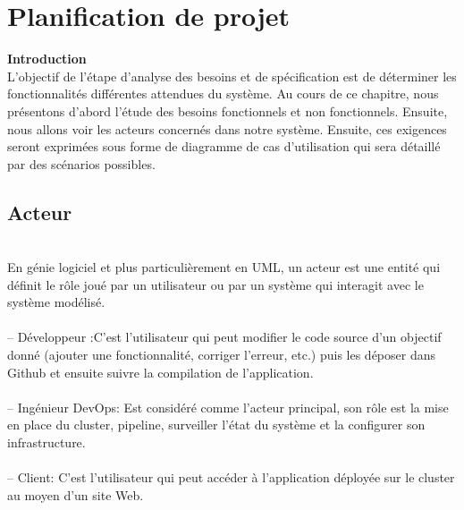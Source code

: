 
\chapter{ Planification de projet}
\newpage
\textbf{\huge Introduction}\\[0.5cm] 

\textsf{\selectfont{}
L'objectif de l'étape d'analyse des besoins et de spécification est de déterminer les fonctionnalités différentes attendues du système. Au cours de ce chapitre, nous présentons d'abord l'étude des besoins fonctionnels et non fonctionnels. Ensuite, nous allons voir les acteurs concernés dans notre système. Ensuite, ces exigences seront exprimées sous forme de diagramme de cas d'utilisation qui sera détaillé par des scénarios possibles.
}
\section{\LARGE Acteur}
\texttt{}\\[0.1cm]
\textsf{\selectfont{} En génie logiciel et plus particulièrement en UML, un acteur est une entité qui définit le rôle joué par un utilisateur ou par un système qui interagit avec le système modélisé.\cite{12}\\\texttt{}\\[0.01cm]%
-- Développeur :C'est l'utilisateur qui peut modifier le code source d'un objectif donné (ajouter une fonctionnalité, corriger l'erreur, etc.) puis les déposer dans Github et ensuite suivre la compilation de l'application.\\\texttt{}\\[0.01cm]
-- Ingénieur DevOps: Est considéré comme l'acteur principal, son rôle est la mise en place du cluster, pipeline, surveiller l'état du système et la configurer son infrastructure.\\\texttt{}\\[0.01cm]
-- Client: C'est l'utilisateur qui peut accéder à l'application déployée sur le cluster au moyen d'un site Web.\\\texttt{}\\[0.01cm]
}

